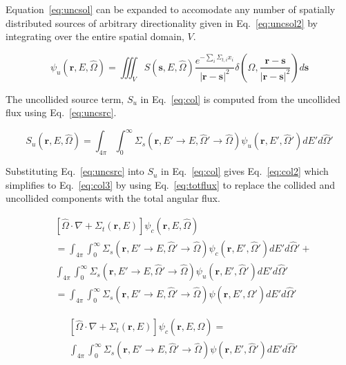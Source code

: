 Equation~\ref{eq:uncsol} can be expanded to accomodate any number of spatially distributed sources of arbitrary directionality given in Eq.~\ref{eq:uncsol2} by integrating over the entire spatial domain, $V$.

\begin{equation} \label{eq:uncsol2}
\psi_u(\boldsymbol{r}, E, \hat{\Omega}) = \iiint_{V}
S(\boldsymbol{s}, E, \hat{\Omega})
\frac{e^{-\sum_i \Sigma_{t,i} x_i}}{|\boldsymbol{r}-\boldsymbol{s}|^2}
\delta\left( \hat{\Omega}, \frac{\boldsymbol{r}-\boldsymbol{s}}{|\boldsymbol{r}-\boldsymbol{s}|^2}\right)
d \boldsymbol{s}
\end{equation}

The uncollided source term, $S_u$ in Eq.~\ref{eq:col} is computed from the uncollided flux using Eq.~\ref{eq:uncsrc}.

\begin{equation} \label{eq:uncsrc}
S_u(\boldsymbol{r}, E, \hat{\Omega}) = \int_{4\pi} \int_{0}^{\infty} 
\Sigma_s(\boldsymbol{r}, E' \rightarrow E, \hat{\Omega}' \rightarrow \hat{\Omega}) \psi_u(\boldsymbol{r}, E', \hat{\Omega}') 
dE' d\hat{\Omega}'
\end{equation}

Substituting Eq.~\ref{eq:uncsrc} into $S_u$ in Eq.~\ref{eq:col} gives Eq.~\ref{eq:col2} which simplifies to Eq.~\ref{eq:col3} by using Eq.~\ref{eq:totflux} to replace the collided and uncollided components with the total angular flux.

\begin{equation} \label{eq:col2}
\begin{split}
	&\left[ \hat{\Omega} \cdot \nabla + \Sigma_t(\boldsymbol{r}, E) \right]
	\psi_c(\boldsymbol{r}, E, \hat{\Omega}) \\
	&=
	\int_{4 \pi} \int_0^\infty \Sigma_s(\boldsymbol{r}, E' \rightarrow E, \hat{\Omega}' \rightarrow \hat{\Omega}) \psi_c(\boldsymbol{r}, E', \hat{\Omega}') dE' d\hat{\Omega}' + \\
	&\int_{4\pi} \int_{0}^{\infty} 
\Sigma_s(\boldsymbol{r}, E' \rightarrow E, \hat{\Omega}' \rightarrow \hat{\Omega}) \psi_u(\boldsymbol{r}, E', \hat{\Omega}') 
dE' d\hat{\Omega}' \\
& = \int_{4 \pi} \int_{0}^{\infty} \Sigma_s(\boldsymbol{r}, E' \rightarrow E, \hat{\Omega}' \rightarrow \hat{\Omega}) \psi(\boldsymbol{r}, E', \hat{\Omega}') dE' d\hat{\Omega}'
\end{split}
\end{equation}

\begin{equation} \label{eq:col3}
\begin{split}
	&\left[ \hat{\Omega} \cdot \nabla + \Sigma_t(\boldsymbol{r}, E) \right]
	\psi_c(\boldsymbol{r}, E, \hat{\Omega}) = \\
	&\int_{4 \pi} \int_0^\infty \Sigma_s(\boldsymbol{r}, E' \rightarrow E, \hat{\Omega}' \rightarrow \hat{\Omega}) \psi(\boldsymbol{r}, E', \hat{\Omega}') dE' d\hat{\Omega}'
\end{split}
\end{equation}


